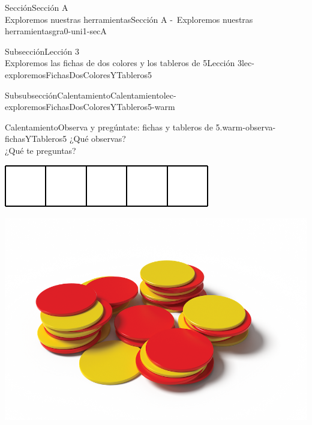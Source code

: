 \begin{sectionptx}{Sección}{{\Large Sección A\\}Exploremos nuestras herramientas}{}{Sección A -~Exploremos nuestras herramientas}{}{}{gra0-uni1-secA}
\begin{subsectionptx}{Subsección}{{\normalsize Lección 3\\[-0.05cm]}Exploremos las fichas de dos colores y los tableros de 5}{}{Lección 3}{}{}{lec-exploremosFichasDosColoresYTableros5}
%
\begin{subsubsectionptx}{Subsubsección}{Calentamiento}{}{Calentamiento}{}{}{lec-exploremosFichasDosColoresYTableros5-warm}
\begin{exploration}{Calentamiento}{Observa y pregúntate: fichas y tableros de 5.}{warm-observa-fichasYTableros5}%
¿Qué observas?\\
 ¿Qué te preguntas?%
\begin{sidebyside}{2}{0.05}{0.05}{0.1}%
\begin{sbspanel}{0.4}%
\includegraphics[max width=\linewidth, center]{external/svg-source/tikz-file-147345.pdf}
\end{sbspanel}%
\begin{sbspanel}{0.4}%
\includegraphics[max width=\linewidth, center]{external/png-source/K.1.A Beta Student Workbook.RedYellowChips_withShadow.png}
\end{sbspanel}%
\end{sidebyside}%
\begin{sidebyside}{2}{0.05}{0.05}{0.1}%
\begin{sbspanel}{0.4}%

\end{sbspanel}
\end{sidebyside}
\end{exploration}
\end{subsubsectionptx}
\end{subsectionptx}
\end{sectionptx}

